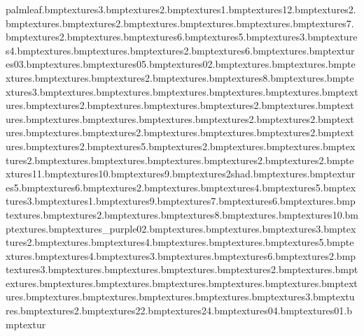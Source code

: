 palmleaf.bmp textures\aquapathred3.bmp textures\aquapathred2.bmp textures\aquapathred1.bmp textures\orangeyelledge12.bmp textures\aquaseawall2.bmp textures\aquarockjoiner.bmp textures\aquaexitsign2.bmp textures\aquaexitsign.bmp textures\aquawelcomesign.bmp textures\ropes.bmp textures\lifehut7.bmp textures\aquasteps2.bmp textures\aquasteps.bmp textures\aquapathred6.bmp textures\aquapathred5.bmp textures\aquaseawall3.bmp textures\aquadock4.bmp textures\aquabarbwire.bmp textures\aquaropeholds.bmp textures\aquaropeholds2.bmp textures\aquadock6.bmp textures\ringmetal.bmp textures\bluhut03.bmp textures\nofish.bmp textures\bluhut05.bmp textures\bluhut02.bmp textures\hutwallpaper.bmp textures\nofishing.bmp textures\aquahutroof.bmp textures\ringmetalred.bmp textures\aquasidewalk2.bmp textures\safariwater.bmp textures\aquadecking8.bmp textures\sackmaterial.bmp textures\sackmaterial3.bmp textures\woodstand.bmp textures\oilbarrel.bmp textures\aquaumbrella.bmp textures\chain.bmp textures\slidegurders.bmp textures\aquapoles.bmp textures\alightroof2.bmp textures\lighthouseblue.bmp textures\lighthousered.bmp textures\lighthousered2.bmp textures\alightfloor.bmp textures\lighthourails.bmp textures\alightposts.bmp textures\alightlight.bmp textures\aquabouncesign.bmp textures\aquasandcas2.bmp textures\castledrawb2.bmp textures\ringmetalblue.bmp textures\castleholes.bmp textures\dishbrush2.bmp textures\castledrawb.bmp textures\aquaarrow.bmp textures\aquaarrow2.bmp textures\targettube.bmp textures\targettube2.bmp textures\wastepipes5.bmp textures\aquapoles2.bmp textures\divingboard.bmp textures\duck.bmp textures\divingboard2.bmp textures\aquadeckingcorn.bmp textures\cross.bmp textures\pyratesign.bmp textures\pyratesign2.bmp textures\lifehut2.bmp textures\lifehut11.bmp textures\lifehut10.bmp textures\lifehut9.bmp textures\lifehut2shad.bmp textures\lifehut.bmp textures\lifehut5.bmp textures\lifehut6.bmp textures\aquapyratesign2.bmp textures\aquaslidesign.bmp textures\aquaslidesigns4.bmp textures\aquaslidesigns5.bmp textures\aquaslidesigns3.bmp textures\aquaslidesigns1.bmp textures\aquaslidesigns9.bmp textures\aquaslidesigns7.bmp textures\aquaslidesigns6.bmp textures\doorgroove.bmp textures\seccam.bmp textures\aquacamera2.bmp textures\aquacamera.bmp textures\aquaslidesigns8.bmp textures\tazspeedpic.bmp textures\aquaslidesigns10.bmp textures\aquasharksign.bmp textures\marbtiles_purple02.bmp textures\sinkhole.bmp textures\sinkedge.bmp textures\aquasoapbox3.bmp textures\aquasoapbox2.bmp textures\aquasoapbox.bmp textures\wastepipes4.bmp textures\tapside.bmp textures\tapcold.bmp textures\dishbrush5.bmp textures\dishbrush.bmp textures\dishbrush4.bmp textures\dishbrush3.bmp textures\wastepipes.bmp textures\wastepipes6.bmp textures\wastepipes2.bmp textures\wastepipes3.bmp textures\washmbubbles.bmp textures\sinkshad.bmp textures\sinkplughole.bmp textures\sinkedge2.bmp textures\tapbot.bmp textures\taphot.bmp textures\beachhutsroof.bmp textures\beachhuts.bmp textures\palmbark.bmp textures\coconut.bmp textures\glassbottle.bmp textures\slidesign.bmp textures\beachsigns.bmp textures\washsignback.bmp textures\marinasign.bmp textures\washsign.bmp textures\aquapyratewood3.bmp textures\aquapyratewood.bmp textures\aquapyratewood2.bmp textures\sign22.bmp textures\sign24.bmp textures\sign04.bmp textures\sign01.bmp textur
